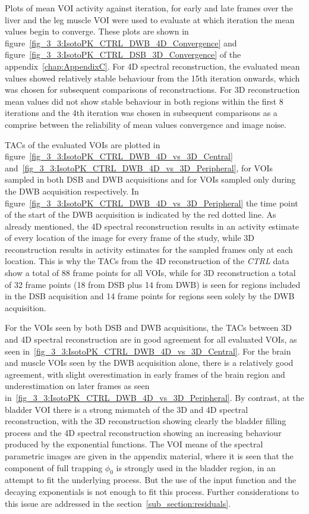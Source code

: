 Plots of mean VOI activity against iteration, for early and late frames over the liver and the leg muscle VOI were used to evaluate at which iteration the mean values begin to converge. These plots are shown in figure~\ref{fig_3_3:IsotoPK_CTRL_DWB_4D_Convergence} and figure~\ref{fig_3_3:IsotoPK_CTRL_DSB_3D_Convergence} of the appendix~\ref{chap:AppendixC}. For 4D spectral reconstruction, the evaluated mean values showed relatively stable behaviour from the 15th iteration onwards, which was chosen for subsequent comparisons of reconstructions. For 3D reconstruction mean values did not show stable behaviour in both regions within the first 8 iterations and the 4th iteration was chosen in subsequent comparisons as a comprise between the reliability of mean values convergence and image noise.  

TACs of the evaluated VOIs are plotted in figure~\ref{fig_3_3:IsotoPK_CTRL_DWB_4D_vs_3D_Central} and~\ref{fig_3_3:IsotoPK_CTRL_DWB_4D_vs_3D_Peripheral}, for VOIs sampled in both DSB and DWB acquisitions and for VOIs sampled only during the DWB acquisition respectively. In figure~\ref{fig_3_3:IsotoPK_CTRL_DWB_4D_vs_3D_Peripheral} the time point of the start of the DWB acquisition is indicated by the red dotted line.
As already mentioned, the 4D spectral reconstruction results in an activity estimate of every location of the image for every frame of the study, while 3D reconstruction results in activity estimates for the sampled frames only at each location. This is why the TACs from the 4D reconstruction of the \textit{CTRL} data show a total of 88 frame points for all VOIs, while for 3D reconstruction a total of 32 frame points (18 from DSB plus 14 from DWB) is seen for regions included in the DSB acquisition and 14 frame points for regions seen solely by the DWB acquisition. 

For the VOIs seen by both DSB and DWB acquisitions, the TACs between 3D and 4D spectral reconstruction are in good agreement for all evaluated VOIs, as seen in~\ref{fig_3_3:IsotoPK_CTRL_DWB_4D_vs_3D_Central}. For the brain and muscle VOIs seen by the DWB acquisition alone, there is a relatively good agreement, with slight overestimation in early frames of the brain region and underestimation on later frames as seen in~\ref{fig_3_3:IsotoPK_CTRL_DWB_4D_vs_3D_Peripheral}. By contrast, at the bladder VOI there is a strong mismatch of the 3D and 4D spectral reconstruction, with the 3D reconstruction showing clearly the bladder filling process and the 4D spectral reconstruction showing an increasing behaviour produced by the exponential functions. 
The VOI means of the spectral parametric images are given in the appendix material, where it is seen that the component of full trapping $\phi_0$ is strongly used in the bladder region, in an attempt to fit the underlying process. But the use of the input function and the decaying exponentials is not enough to fit this process. Further considerations to this issue are addressed in the section~\ref{sub_section:residuals}.

